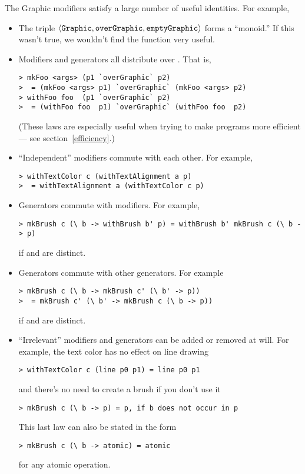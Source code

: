 The Graphic modifiers satisfy a large number of useful identities.
For example, 

\begin{itemize}
\item
  The triple $\langle {\tt Graphic\/}, {\tt overGraphic\/}, {\tt emptyGraphic\/} \rangle$
  forms a ``monoid.'' If this wasn't true, we wouldn't find the
   function very useful.

\item
  Modifiers and generators all distribute over .
  That is,
\begin{verbatim}
> mkFoo <args> (p1 `overGraphic` p2) 
>  = (mkFoo <args> p1) `overGraphic` (mkFoo <args> p2)
> withFoo foo  (p1 `overGraphic` p2) 
>  = (withFoo foo  p1) `overGraphic` (withFoo foo  p2)
\end{verbatim}

(These laws are especially useful when trying to make programs more efficient
--- see section~\ref{efficiency}.)

\item
  ``Independent'' modifiers commute with each other.
  For example,
\begin{verbatim}
> withTextColor c (withTextAlignment a p) 
>  = withTextAlignment a (withTextColor c p)
\end{verbatim}

\item
  Generators commute with modifiers.
  For example,
\begin{verbatim}
> mkBrush c (\ b -> withBrush b' p) = withBrush b' mkBrush c (\ b -> p)
\end{verbatim}
  if  and  are distinct.

\item
  Generators commute with other generators.  For example

\begin{verbatim}
> mkBrush c (\ b -> mkBrush c' (\ b' -> p)) 
>  = mkBrush c' (\ b' -> mkBrush c (\ b -> p))
\end{verbatim}
  if  and  are distinct.

\item
  ``Irrelevant'' modifiers and generators can be added or removed at will.
  For example, the text color has no effect on line drawing
\begin{verbatim}
> withTextColor c (line p0 p1) = line p0 p1
\end{verbatim}
  and there's no need to create a brush if you don't use it
\begin{verbatim}
> mkBrush c (\ b -> p) = p, if b does not occur in p
\end{verbatim}

This last law can also be stated in the form
\begin{verbatim}
> mkBrush c (\ b -> atomic) = atomic
\end{verbatim}
for any atomic operation.

\end{itemize}


